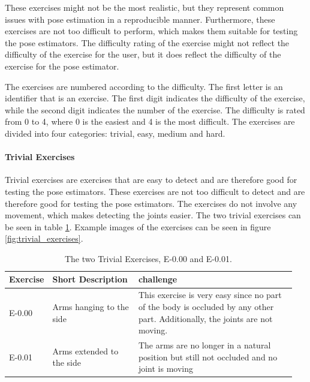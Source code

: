 These exercises might not be the most realistic, but they represent common issues with pose estimation in a reproducible manner. Furthermore, these exercises are not too difficult to perform, which makes them suitable for testing the pose estimators. The difficulty rating of the exercise might not reflect the difficulty of the exercise for the user, but it does reflect the difficulty of the exercise for the pose estimator.

The exercises are numbered according to the difficulty. The first letter is an identifier that is an exercise. The first digit indicates the difficulty of the exercise, while the second digit indicates the number of the exercise. The difficulty is rated from 0 to 4, where 0 is the easiest and 4 is the most difficult. The exercises are divided into four categories: trivial, easy, medium and hard.

\paragraph{Trivial Exercises}

Trivial exercises are exercises that are easy to detect and are therefore good for testing the pose estimators. These exercises are not too difficult to detect and are therefore good for testing the pose estimators. The exercises do not involve any movement, which makes detecting the joints easier. The two trivial exercises can be seen in table \ref{tab:trivial_exercises}. Example images of the exercises can be seen in figure \ref{fig:trivial_exercises}.

\begin{table}[ht]
  \caption[Trivial Exercises]{The two Trivial Exercises, E-0.00 and E-0.01.}
  \label{tab:trivial_exercises}
  \begin{tabular}{p{0.1\linewidth}p{0.3\linewidth}p{0.55\linewidth}}
  \hline
  Exercise & Short Description         & challenge   \\ \hline
  E-0.00   & Arms hanging to the side  & This exercise is very easy since no part of the body is occluded by any other part. Additionally, the joints are not moving. \\
  E-0.01   & Arms extended to the side & The arms are no longer in a natural position but still not occluded and no joint is moving \\ \hline
  \end{tabular}
\end{table} 



